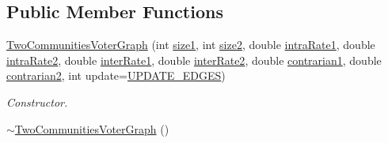 \subsection*{Public Member Functions}
\begin{DoxyCompactItemize}
\item 
\hyperlink{class_two_communities_voter_graph_a63c60c10b48a21413f7f60033448024e}{Two\-Communities\-Voter\-Graph} (int \hyperlink{class_two_communities_voter_graph_a3c9db0ac7e58d875ab3ce277bf74b284}{size1}, int \hyperlink{class_two_communities_voter_graph_a8b88457f020773b984e0d8c85d9ee502}{size2}, double \hyperlink{class_two_communities_voter_graph_a96a32ba7529177a7f6b73e827a57791e}{intra\-Rate1}, double \hyperlink{class_two_communities_voter_graph_a6e7ea06e014d75b7bf18441885e07e1e}{intra\-Rate2}, double \hyperlink{class_two_communities_voter_graph_af08c3b9a6e6f1dc8659a38ecd2d1afde}{inter\-Rate1}, double \hyperlink{class_two_communities_voter_graph_afab8bb5994f7fd1370d7d81caf7277d4}{inter\-Rate2}, double \hyperlink{class_two_communities_voter_graph_a883bf57bf07fb2e59f05df65df859a46}{contrarian1}, double \hyperlink{class_two_communities_voter_graph_a4274a05f5e2ceae57de1f0e71493b9a4}{contrarian2}, int update=\hyperlink{voter__graph_8hpp_ab3bec55c359e4ed771339c8bc61fc35aa01d100088352e1a7d3a34c9a66d0f951}{U\-P\-D\-A\-T\-E\-\_\-\-E\-D\-G\-E\-S})
\begin{DoxyCompactList}\small\item\em Constructor. \end{DoxyCompactList}\item 
\hypertarget{class_two_communities_voter_graph_ab74e186e76188e7de8ae11359ad1e55e}{\hyperlink{class_two_communities_voter_graph_ab74e186e76188e7de8ae11359ad1e55e}{$\sim$\-Two\-Communities\-Voter\-Graph} ()}\label{class_two_communities_voter_graph_ab74e186e76188e7de8ae11359ad1e55e}


\end{DoxyCompactItemize}
